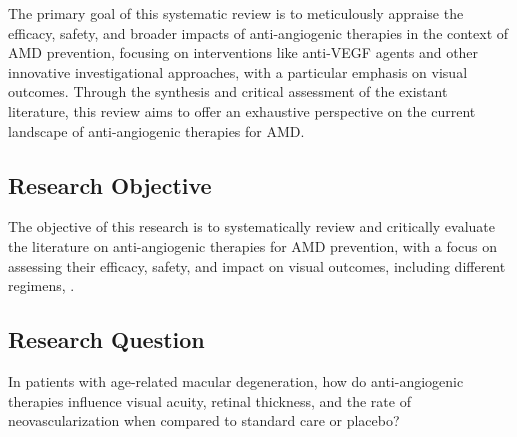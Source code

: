 The primary goal of this systematic review is to meticulously appraise the efficacy, safety, and broader impacts of anti-angiogenic therapies in the context of AMD prevention, focusing on interventions like anti-VEGF agents and other innovative investigational approaches, with a particular emphasis on visual outcomes. Through the synthesis and critical assessment of the existant literature, this review aims to offer an exhaustive perspective on the current landscape of anti-angiogenic therapies for AMD.

\subsection{Research Objective}\label{s:researchobjective}
The objective of this research is to systematically review and critically evaluate the literature on anti-angiogenic therapies for AMD prevention, with a focus on assessing their efficacy, safety, and impact on visual outcomes, including different regimens, \eg \TreatAndExtend.

\subsection{Research Question}\label{s:researchquestion}
In patients with age-related macular degeneration, how do anti-angiogenic therapies influence visual acuity, retinal thickness, and the rate of neovascularization when compared to standard care or placebo?

\vfill
\newpage